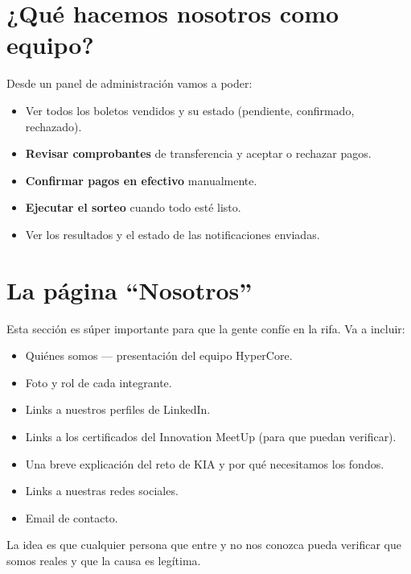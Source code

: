 \documentclass[12pt,a4paper]{article}
\begin{document}
\section{¿Qué hacemos nosotros como equipo?}

Desde un panel de administración vamos a poder:

\begin{itemize}[leftmargin=2em]
    \item Ver todos los boletos vendidos y su estado (pendiente, confirmado, rechazado).
    \item \textbf{Revisar comprobantes} de transferencia y aceptar o rechazar pagos.
    \item \textbf{Confirmar pagos en efectivo} manualmente.
    \item \textbf{Ejecutar el sorteo} cuando todo esté listo.
    \item Ver los resultados y el estado de las notificaciones enviadas.
\end{itemize}

\section{La página ``Nosotros''}

Esta sección es súper importante para que la gente confíe en la rifa. Va a incluir:

\begin{itemize}[leftmargin=2em]
    \item Quiénes somos --- presentación del equipo HyperCore.
    \item Foto y rol de cada integrante.
    \item Links a nuestros perfiles de LinkedIn.
    \item Links a los certificados del Innovation MeetUp (para que puedan verificar).
    \item Una breve explicación del reto de KIA y por qué necesitamos los fondos.
    \item Links a nuestras redes sociales.
    \item Email de contacto.
\end{itemize}

La idea es que cualquier persona que entre y no nos conozca pueda verificar que somos reales y que la causa es legítima.
\end{document}
